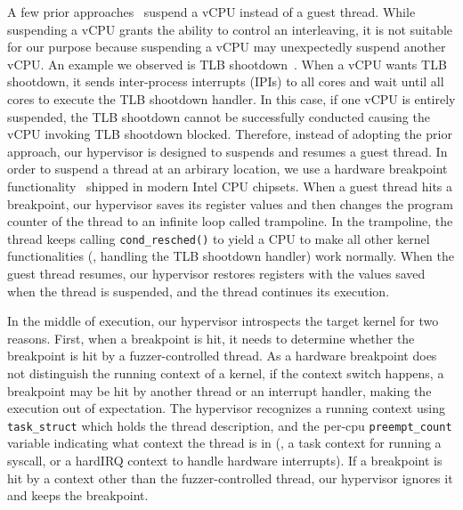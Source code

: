 %
A few prior approaches~\cite{ski, snowboard, razzer} suspend a vCPU
instead of a guest thread. While suspending a vCPU grants the ability
to control an interleaving, it is not suitable for our purpose because
suspending a vCPU may unexpectedly suspend another vCPU. An example we
observed is TLB shootdown~\cite{tlbshootdown}. When a vCPU wants TLB
shootdown, it sends inter-process interrupts (IPIs) to all cores and
wait until all cores to execute the TLB shootdown handler.  In this
case, if one vCPU is entirely suspended, the TLB shootdown cannot be
successfully conducted causing the vCPU invoking TLB shootdown
blocked.
%
Therefore, instead of adopting the prior approach, our hypervisor is
designed to suspends and resumes a guest thread.
%
In order to suspend a thread at an arbirary location, we use a
hardware breakpoint functionality~\cite{hwbp} shipped in modern Intel
CPU chipsets.
%
When a guest thread hits a breakpoint, our hypervisor saves its
register values and then changes the program counter of the thread to
an infinite loop called trampoline. In the trampoline, the thread
keeps calling \texttt{cond_resched()} to yield a CPU to make all other
kernel functionalities (\eg, handling the TLB shootdown handler) work
normally. When the guest thread resumes, our hypervisor restores
registers with the values saved when the thread is suspended, and the
thread continues its execution.


%
%
In the middle of execution, our hypervisor introspects the target
kernel for two reasons.
%
First, when a breakpoint is hit, it needs to determine whether the
breakpoint is hit by a fuzzer-controlled thread.
%
As a hardware breakpoint does not distinguish the running context of a
kernel, if the context switch happens, a breakpoint may be hit by
another thread or an interrupt handler, making the execution out of
expectation.
%
The hypervisor recognizes a running context using \texttt{task_struct}
which holds the thread description, and the per-cpu
\texttt{preempt_count} variable indicating what context the thread is
in (\eg, a task context for running a syscall, or a hardIRQ context to
handle hardware interrupts).
%
If a breakpoint is hit by a context other than the fuzzer-controlled
thread, our hypervisor ignores it and keeps the breakpoint.

